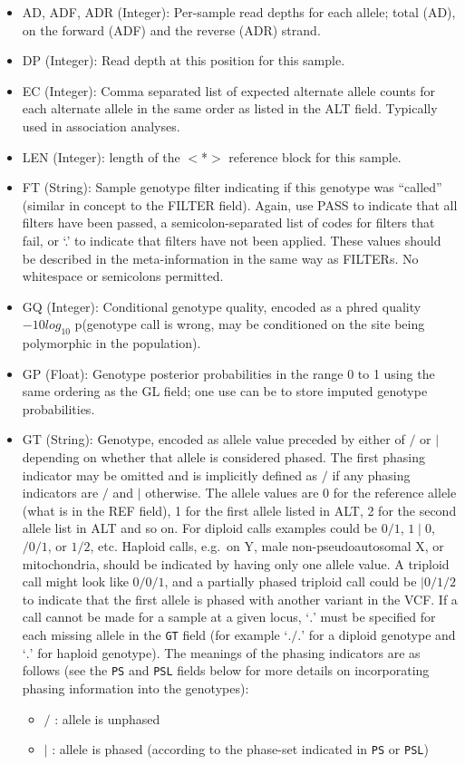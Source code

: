 \documentclass[8pt]{article}
\begin{document}
\begin{itemize}
\renewcommand{\labelitemii}{$\circ$}
  \item AD, ADF, ADR (Integer): Per-sample read depths for each allele; total (AD), on the forward (ADF) and the reverse (ADR) strand.
  \item DP (Integer): Read depth at this position for this sample.
  \item EC (Integer): Comma separated list of expected alternate allele counts for each alternate allele in the same order as listed in the ALT field.
  Typically used in association analyses.
  \item LEN (Integer): length of the $<$*$>$ reference block for this sample.
  \item FT (String): Sample genotype filter indicating if this genotype was ``called'' (similar in concept to the FILTER field).
  Again, use PASS to indicate that all filters have been passed, a semicolon-separated list of codes for filters that fail, or `.' to indicate that filters have not been applied.
  These values should be described in the meta-information in the same way as FILTERs.
  No whitespace or semicolons permitted.
  \item GQ (Integer): Conditional genotype quality, encoded as a phred quality $-10log_{10}$ p(genotype call is wrong, may be conditioned on the site being polymorphic in the population).
  \item GP (Float): Genotype posterior probabilities in the range 0 to 1 using the same ordering as the GL field; one use can be to store imputed genotype probabilities.
  \item GT (String): Genotype, encoded as allele value preceded by either of $/$ or $\mid$ depending on whether that allele is considered phased. 
    The first phasing indicator may be omitted and is implicitly defined as $/$ if any phasing indicators are $/$ and $\mid$ otherwise.
    The allele values are 0 for the reference allele (what is in the REF field), 1 for the first allele listed in ALT, 2 for the second allele list in ALT and so on.
    For diploid calls examples could be $0/1$, $1\mid0$, $/0/1$, or $1/2$, etc.
    Haploid calls, e.g.\ on Y, male non-pseudoautosomal X, or mitochondria, should be indicated by having only one allele value.
    A triploid call might look like $0/0/1$, and a partially phased triploid call could be $|0/1/2$ to indicate that the first allele is phased with another variant in the VCF.
    If a call cannot be made for a sample at a given locus, `$.$' must be specified for each missing allele in the {\tt GT} field (for example `$./.$' for a diploid genotype and `$.$' for haploid genotype).
    The meanings of the phasing indicators are as follows (see the {\tt PS} and {\tt PSL} fields below for more details on incorporating phasing information into the genotypes):
    \begin{itemize}
      \item $/$ : allele is unphased
      \item $\mid$ : allele is phased (according to the phase-set indicated in {\tt PS} or {\tt PSL})
    \end{itemize}


\end{itemize}
\end{document}
